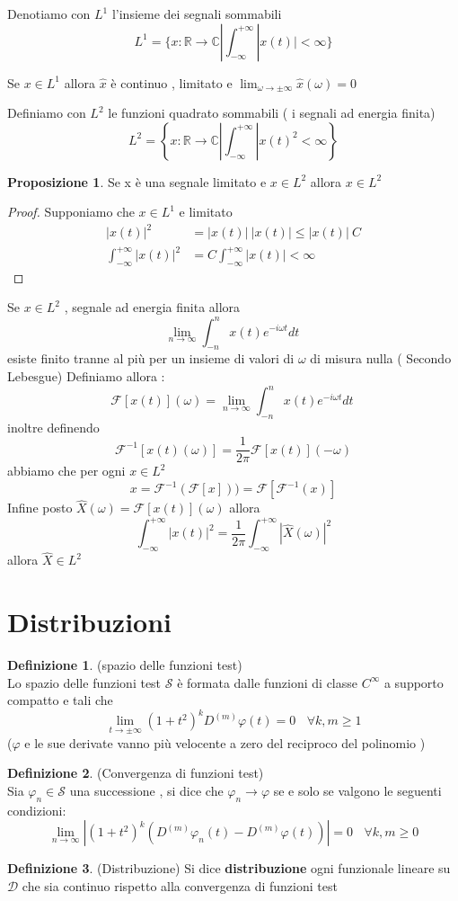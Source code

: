 \documentclass{article}
\theoremstyle{definition}
\newtheorem*{definizione}{Definizione}
\newtheorem*{proposizione}{Proposizione}
\newcommand{\R}{\mathbb{R}}
\newcommand{\C}{\mathbb{C}}
\newcommand{\intinf}{\int_{-\infty}^{+\infty}}
\newcommand{\f}{\mathscr{F}}
\newcommand{\norm}[1]{|#1|}
\begin{document}
Denotiamo con $L^1$ l'insieme dei segnali sommabili 
$$L^1 = \{x:\R\rightarrow\mathbb{C} | \intinf |x(t)| < \infty \}$$
\begin{teo}{}{}
	Se $ x \in L^1$ allora $\widehat{x}$ è continuo , limitato e $\lim_{\omega \rightarrow \pm \infty}\widehat{x}(\omega)=0$
\end{teo}
Definiamo con $L^2$ le funzioni quadrato sommabili ( i segnali ad energia finita)
$$L^2=\left\{x:\R \rightarrow \C | \intinf |x(t)^2 < \infty\right\}$$
\begin{proposizione}
	Se x è una segnale limitato e $x \in L^2$ allora $x\in L^2$
\end{proposizione}
\begin{proof}
	Supponiamo che $x\in L^1$ e limitato
	\begin{align*}
		|x(t)|^2&=|x(t)| \ |x(t)| \leq |x(t)| \ C \\
		\intinf 	|x(t)|^2 &= C \intinf 	|x(t)| < \infty 
	\end{align*}
\end{proof}
\begin{teo}{}{}
Se $ x \in L^2$ , segnale ad energia finita allora 
$$\lim_{n\rightarrow \infty}\int_{-n}^{n}x(t)e^{-i\omega t}dt \ $$
esiste finito tranne al più per un insieme di valori di $\omega$  di misura nulla ( Secondo Lebesgue)
Definiamo allora : 
$$\f[x(t)](\omega)=\lim_{n\rightarrow \infty}\int_{-n}^{n}x(t)e^{-i\omega t}dt \ $$
inoltre definendo $$\f^{-1}[x(t)(\omega)]=\frac{1}{2\pi}\f[x(t)](-\omega)$$ abbiamo che per ogni $x \in L^2$ 
$$x=\f^{-1}(\f[x]))=\f[\f^{-1}(x)]$$
Infine posto $\widehat{X}(\omega)=\f[x(t)](\omega)$ allora 
$$\intinf |x(t)|^2 =\frac{1}{2\pi} \intinf| \widehat{X}(\omega) |^2$$
allora $\widehat{X}\in L^2$
\end{teo}
\newpage
\section{Distribuzioni}
\begin{definizione}(spazio delle funzioni test)\\
	Lo spazio delle funzioni test $\mathscr{S}$ è formata dalle funzioni di classe $C^\infty$ a supporto compatto e tali che 
	$$\lim_{t\rightarrow \pm \infty}(1+t^2)^k D^{(m)}\varphi(t)=0  \ \ \ \ \forall k,m\geq 1$$
	($\varphi$ e le sue derivate vanno più velocente a zero del reciproco del polinomio )
	\end{definizione}
	\begin{definizione}(Convergenza di funzioni test)\\
	Sia $\varphi_n \in \mathscr{S}$ una successione , si dice che $\varphi_n \rightarrow \varphi$ se e solo se valgono le seguenti condizioni:
	$$\lim_{n\rightarrow \infty} \norm{(1+t^2)^k (D^{(m)}\varphi_n(t)-D^{(m)}\varphi(t))}=0  \ \ \ \ \forall k,m \geq 0$$
	\end{definizione}
\begin{definizione}(Distribuzione)
	Si dice \textbf{distribuzione} ogni funzionale lineare su $\mathscr{D}$ che sia continuo rispetto alla convergenza di funzioni test 
	\end{definizione}
\end{document}
